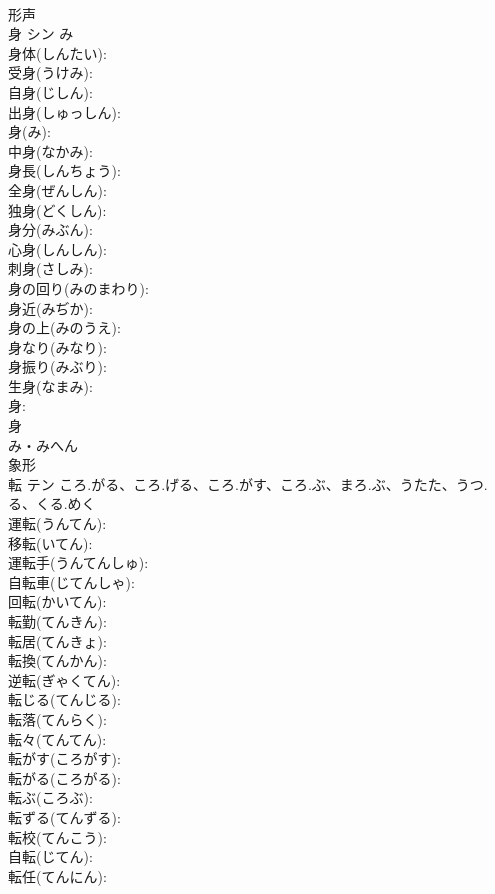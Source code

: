\documentclass[8pt]{extreport}
\begin{document}
\begin{CJK}{UTF8}{min}
\\	形声 
\\	身	シン	み		
\\	身体(しんたい): 
\\	受身(うけみ): 
\\	自身(じしん): 
\\	出身(しゅっしん): 
\\	身(み): 
\\	中身(なかみ): 
\\	身長(しんちょう): 
\\	全身(ぜんしん): 
\\	独身(どくしん): 
\\	身分(みぶん): 
\\	心身(しんしん): 
\\	刺身(さしみ): 
\\	身の回り(みのまわり): 
\\	身近(みぢか): 
\\	身の上(みのうえ): 
\\	身なり(みなり): 
\\	身振り(みぶり): 
\\	生身(なまみ): 
\\	身: 
\\	身	
\\	み・みへん	
\\	象形 
\\	転	テン	ころ.がる、ころ.げる、ころ.がす、ころ.ぶ、まろ.ぶ、うたた、うつ.る、くる.めく		
\\	運転(うんてん): 
\\	移転(いてん): 
\\	運転手(うんてんしゅ): 
\\	自転車(じてんしゃ): 
\\	回転(かいてん): 
\\	転勤(てんきん): 
\\	転居(てんきょ): 
\\	転換(てんかん): 
\\	逆転(ぎゃくてん): 
\\	転じる(てんじる): 
\\	転落(てんらく): 
\\	転々(てんてん): 
\\	転がす(ころがす): 
\\	転がる(ころがる): 
\\	転ぶ(ころぶ): 
\\	転ずる(てんずる): 
\\	転校(てんこう): 
\\	自転(じてん): 
\\	転任(てんにん): 

\end{CJK}
\end{document}
